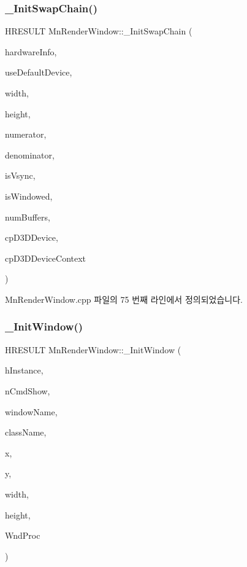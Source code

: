 \subsubsection{\texorpdfstring{\+\_\+\+Init\+Swap\+Chain()}{\_InitSwapChain()}}
{\footnotesize\ttfamily H\+R\+E\+S\+U\+LT Mn\+Render\+Window\+::\+\_\+\+Init\+Swap\+Chain (\begin{DoxyParamCaption}\item[{const \hyperlink{class_m_n_l_1_1_mn_hardware}{Mn\+Hardware} \&}]{hardware\+Info,  }\item[{bool}]{use\+Default\+Device,  }\item[{float}]{width,  }\item[{float}]{height,  }\item[{U\+I\+NT}]{numerator,  }\item[{U\+I\+NT}]{denominator,  }\item[{bool}]{is\+Vsync,  }\item[{bool}]{is\+Windowed,  }\item[{U\+I\+NT}]{num\+Buffers,  }\item[{const \hyperlink{namespace_m_n_l_a1eec210db8f309a4a9ac0d9658784c31}{C\+P\+D3\+D\+Device}}]{cp\+D3\+D\+Device,  }\item[{const \hyperlink{namespace_m_n_l_aab3aabb6c9360e44ddc8b0bb563c2107}{C\+P\+D3\+D\+Device\+Context}}]{cp\+D3\+D\+Device\+Context }\end{DoxyParamCaption})\hspace{0.3cm}{\ttfamily [private]}}



Mn\+Render\+Window.\+cpp 파일의 75 번째 라인에서 정의되었습니다.

\mbox{\label{class_m_n_l_1_1_mn_render_window_afb3f077d0738f9db3efe605597f88da8}} 
\subsubsection{\texorpdfstring{\+\_\+\+Init\+Window()}{\_InitWindow()}}
{\footnotesize\ttfamily H\+R\+E\+S\+U\+LT Mn\+Render\+Window\+::\+\_\+\+Init\+Window (\begin{DoxyParamCaption}\item[{H\+I\+N\+S\+T\+A\+N\+CE}]{h\+Instance,  }\item[{int}]{n\+Cmd\+Show,  }\item[{std\+::wstring}]{window\+Name,  }\item[{std\+::wstring}]{class\+Name,  }\item[{float}]{x,  }\item[{float}]{y,  }\item[{float}]{width,  }\item[{float}]{height,  }\item[{W\+N\+D\+P\+R\+OC}]{Wnd\+Proc }\end{DoxyParamCaption})\hspace{0.3cm}{\ttfamily [private]}}



